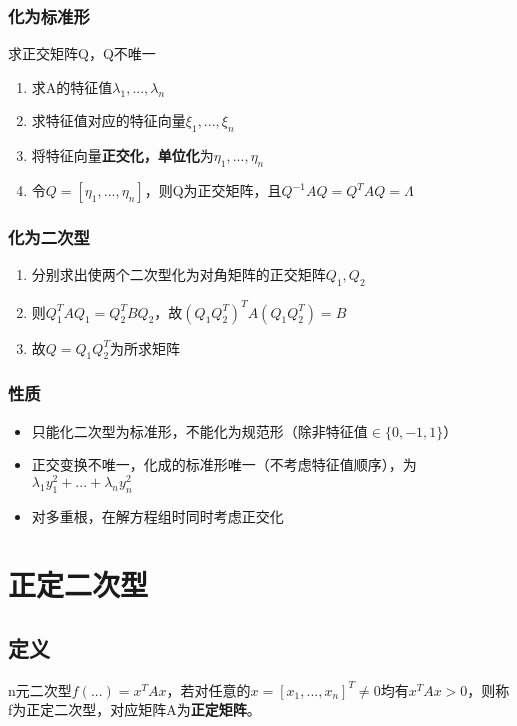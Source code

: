 \subsubsection{化为标准形}
求正交矩阵Q，Q不唯一
\begin{enumerate}
    \item 求A的特征值\(\lambda_1, ..., \lambda_n\)
    \item 求特征值对应的特征向量\(\xi_1, ..., \xi_n\)
    \item 将特征向量\textbf{正交化，单位化}为\(\eta_1, ..., \eta_n\)
    \item 令\(Q = [\eta_1, ..., \eta_n]\)，则Q为正交矩阵，且\(Q^{-1}AQ = Q^TAQ = \Lambda\)
\end{enumerate}

\subsubsection{化为二次型}
\begin{enumerate}
    \item 分别求出使两个二次型化为对角矩阵的正交矩阵\(Q_1, Q_2\)
    \item 则\(Q_1^TAQ_1 = Q_2^TBQ_2\)，故\((Q_1Q_2^T)^TA(Q_1Q_2^T) = B\)
    \item 故\(Q = Q_1Q_2^T\)为所求矩阵
\end{enumerate}


\subsubsection{性质}
\begin{itemize}
    \item 只能化二次型为标准形，不能化为规范形（除非特征值\(\in \{0, -1, 1\}\)）
    \item 正交变换不唯一，化成的标准形唯一（不考虑特征值顺序），为\(\lambda_1y_1^2 + ... + \lambda_ny_n^2\)
    \item 对多重根，在解方程组时同时考虑正交化
\end{itemize}




\section{正定二次型}

\subsection{定义}
n元二次型\(f(...) = x^TAx\)，若对任意的\(x = [x_1,..., x_n]^T \neq 0\)均有\(x^TAx > 0\)，则称f为正定二次型，对应矩阵A为\textbf{正定矩阵}。


